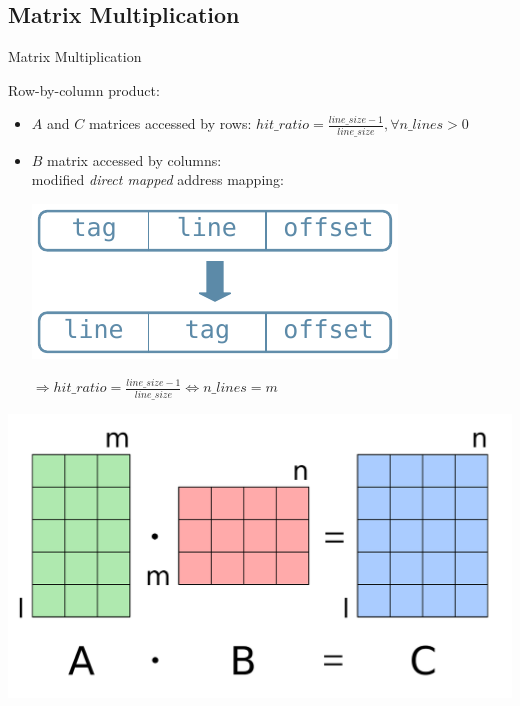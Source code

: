 \documentclass[handout]{beamer}
\begin{document}
\subsection{Matrix Multiplication}
\begin{frame}{Matrix Multiplication}
	\begin{minipage}{.75\textwidth}
		Row-by-column product:
		\begin{itemize}[<+->]
			\item $A$ and $C$ matrices
				accessed by rows:
				$hit\_ratio = \frac{line\_size - 1}{line\_size}, \forall n\_lines > 0$
			\item $B$ matrix accessed by columns:\\
				modified \emph{direct mapped}
				address mapping:

				\begin{center}
					\includegraphics[width=.3\textwidth]{mmul_addr.pdf}
				\end{center}

				$\Rightarrow hit\_ratio = \frac{line\_size - 1}{line\_size} \Leftrightarrow n\_lines = m$
		\end{itemize}
	\end{minipage}
	\begin{minipage}{.23\textwidth}
		\begin{center}
			\includegraphics[width=.9\textwidth]{matmul.png}
		\end{center}
	\end{minipage}
\end{frame}
\end{document}
